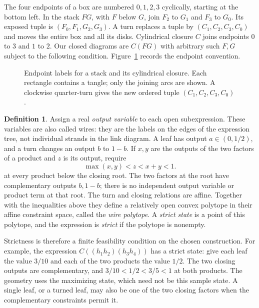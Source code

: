 \documentclass[11pt]{article}
\numberwithin{equation}{section}
\theoremstyle{definition}\newtheorem{definition}[theorem]{Definition}
\theoremstyle{remark}\newtheorem{remark}[theorem]{Remark}
\begin{document}
The four endpoints of a box are numbered $0,1,2,3$ cyclically, starting
at the bottom left. In the stack $FG$, with $F$ below $G$, join
$F_2$ to $G_1$ and $F_3$ to $G_0$. Its exposed tuple is
$(F_0,F_1,G_2,G_3)$. A turn replaces a tuple by
$(C_1,C_2,C_3,C_0)$ and moves the entire box and all its disks.
Cylindrical closure $C$ joins endpoints $0$ to $3$ and $1$ to $2$.
Our closed diagrams are $C(FG)$ with arbitrary such $F,G$ subject to
the following condition. Figure~\ref{sm:endpoint-figure} records the endpoint convention.

\begin{figure}[ht]
\centering
\caption{Endpoint labels for a stack and its cylindrical closure.
Each rectangle contains a tangle; only the joining arcs are shown.
A clockwise quarter-turn gives the new ordered tuple
$(C_1,C_2,C_3,C_0)$.}
\label{sm:endpoint-figure}
\end{figure}

\begin{definition}\label{sm:strict}
Assign a real \emph{output variable} to each open subexpression.
These variables are also called wires: they are the labels on the
edges of the expression tree, not individual strands in the link
diagram. A leaf has output $a\in(0,1/2)$, and a turn changes an
output $b$ to $1-b$. If $x,y$ are the outputs of the two factors
of a product and $z$ is its output, require
\begin{equation}\label{sm:gate-domain}
             \max(x,y)<z<x+y<1.
\end{equation}
at every product below the closing root. The two factors at the root
have complementary outputs $b,1-b$; there is no independent output
variable or product term at that root. The turn and closing relations
are affine. Together with the inequalities above they define a
relatively open convex polytope in their affine constraint space,
called the \emph{wire polytope}. A \emph{strict state} is a point of
this polytope, and the expression is \emph{strict} if the polytope is
nonempty.
\end{definition}

Strictness is therefore a finite feasibility condition on the chosen
construction. For example, the expression
$C((h_1h_2)(h_3h_4))$ has a strict state: give each leaf the value
$3/10$ and each of the two products the value $1/2$. The two closing
outputs are complementary, and $3/10<1/2<3/5<1$ at both products.
The geometry uses the maximizing state, which need not be this sample
state. A single leaf, or a turned leaf, may also be one of the two
closing factors when the complementary constraints permit it.
\end{document}
